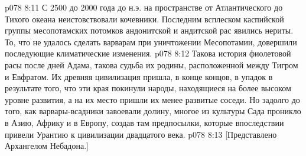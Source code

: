 \vs p078 8:11 С 2500 до 2000 года до н.э. на пространстве от Атлантического до Тихого океана неистовствовали кочевники. Последним всплеском каспийской группы месопотамских потомков андонитской и андитской рас явились нериты. То, что не удалось сделать варварам при уничтожении Месопотамии, довершили последующие климатические изменения.
\vs p078 8:12 \pc Такова история фиолетовой расы после дней Адама, такова судьба их родины, расположенной между Тигром и Евфратом. Их древняя цивилизация пришла, в конце концов, в упадок в результате того, что эти края покинули народы, находящиеся на более высоком уровне развития, а на их место пришли их менее развитые соседи. Но задолго до того, как варвары\hyp{}всадники завоевали долину, многое из культуры Сада проникло в Азию, Африку и в Европу, создав там предпосылки, которые впоследствии привели Урантию к цивилизации двадцатого века.
\vsetoff
\vs p078 8:13 [Представлено Архангелом Небадона.]
